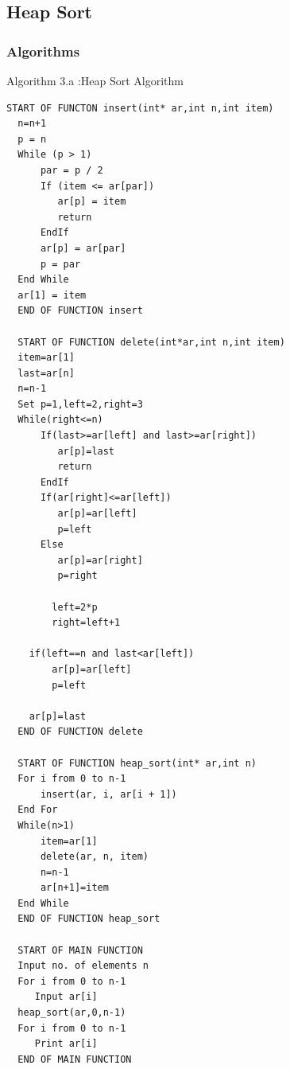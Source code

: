 \documentclass[14pt, letterpaper]{article}
\begin{document}
\subsection{Heap Sort}
\subsubsection{Algorithms}
\hline 
\vspace{0.1cm}
\hspace{0.5cm}Algorithm 3.a :Heap Sort Algorithm
\vspace{0.1cm}
\hline

\begin{lstlisting}[label={list:first}]
  START OF FUNCTON insert(int* ar,int n,int item)
  n=n+1
  p = n
  While (p > 1) 
      par = p / 2
      If (item <= ar[par]) 
         ar[p] = item
         return
      EndIf
      ar[p] = ar[par]
      p = par
  End While
  ar[1] = item
  END OF FUNCTION insert
  
  START OF FUNCTION delete(int*ar,int n,int item)
  item=ar[1]
  last=ar[n]
  n=n-1
  Set p=1,left=2,right=3
  While(right<=n)
      If(last>=ar[left] and last>=ar[right])
         ar[p]=last
         return
      EndIf  
      If(ar[right]<=ar[left])
         ar[p]=ar[left]
         p=left
      Else
         ar[p]=ar[right]
         p=right
        
        left=2*p
        right=left+1
    
    if(left==n and last<ar[left])
        ar[p]=ar[left]
        p=left
    
    ar[p]=last
  END OF FUNCTION delete
  
  START OF FUNCTION heap_sort(int* ar,int n)
  For i from 0 to n-1
      insert(ar, i, ar[i + 1])
  End For 
  While(n>1)
      item=ar[1]
      delete(ar, n, item)
      n=n-1
      ar[n+1]=item
  End While
  END OF FUNCTION heap_sort
  
  START OF MAIN FUNCTION
  Input no. of elements n 
  For i from 0 to n-1 
     Input ar[i]
  heap_sort(ar,0,n-1)
  For i from 0 to n-1 
     Print ar[i]
  END OF MAIN FUNCTION
\end{lstlisting}
\hline
\end{document}
